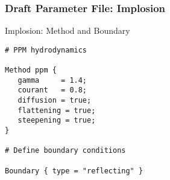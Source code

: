 \begin{frame}[fragile] \frametitle{Draft Parameter File: Implosion}
\footnotesize
\begin{block}{Implosion: Method and Boundary}
\begin{verbatim}
# PPM hydrodynamics

Method ppm {
   gamma     = 1.4;
   courant   = 0.8;
   diffusion = true;
   flattening = true;
   steepening = true;
}

# Define boundary conditions

Boundary { type = "reflecting" }
\end{verbatim}
\end{block}
\end{frame}
